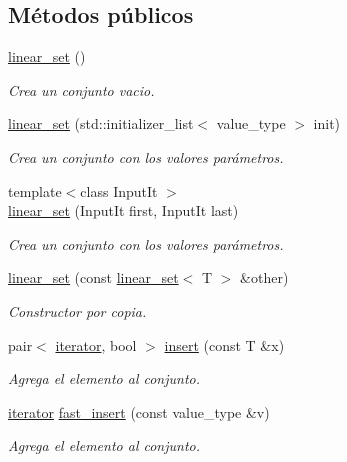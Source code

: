 \subsection*{Métodos públicos}
\begin{DoxyCompactItemize}
\item 
\hyperlink{classlinear__set_a6d872f648b8f79012ad962ad852f8ae7}{linear\-\_\-set} ()
\begin{DoxyCompactList}\small\item\em Crea un conjunto vacio. \end{DoxyCompactList}\item 
\hyperlink{classlinear__set_aa99e56c1ec649af8f0fa8c681d31fcb6}{linear\-\_\-set} (std\-::initializer\-\_\-list$<$ value\-\_\-type $>$ init)
\begin{DoxyCompactList}\small\item\em Crea un conjunto con los valores parámetros. \end{DoxyCompactList}\item 
{\footnotesize template$<$class Input\-It $>$ }\\\hyperlink{classlinear__set_ac1949a93e1927b46604fbdcecb8a1ae3}{linear\-\_\-set} (Input\-It first, Input\-It last)
\begin{DoxyCompactList}\small\item\em Crea un conjunto con los valores parámetros. \end{DoxyCompactList}\item 
\hyperlink{classlinear__set_a45f6e9a11657e0945e88300da619af22}{linear\-\_\-set} (const \hyperlink{classlinear__set}{linear\-\_\-set}$<$ T $>$ \&other)
\begin{DoxyCompactList}\small\item\em Constructor por copia. \end{DoxyCompactList}\item 
pair$<$ \hyperlink{classlinear__set_1_1iterator}{iterator}, bool $>$ \hyperlink{classlinear__set_a66b2d1323a28dcd2dd7511e4b65f4529}{insert} (const T \&x)
\begin{DoxyCompactList}\small\item\em Agrega el elemento al conjunto. \end{DoxyCompactList}\item 
\hyperlink{classlinear__set_1_1iterator}{iterator} \hyperlink{classlinear__set_a095fc4a1f15f43650efa7518aa58579f}{fast\-\_\-insert} (const value\-\_\-type \&v)
\begin{DoxyCompactList}\small\item\em Agrega el elemento al conjunto. \end{DoxyCompactList}\item 

\end{DoxyCompactItemize}
